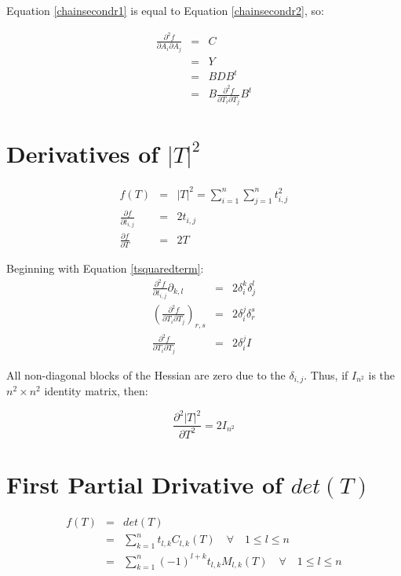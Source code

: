 \documentclass{report}
\begin{document}
Equation \ref{chainsecondr1} is equal to Equation \ref{chainsecondr2}, so:

\begin{eqnarray}
\frac{\partial^2 f}{\partial A_i \partial A_j} &=& C \\
&=& Y \\
&=& B D B^t \\
&=& B \frac{\partial^2 f}{\partial T_i \partial T_j} B^t 
\end{eqnarray}



\section{Derivatives of $|T|^2$}

\begin{eqnarray}
f(T) &=& |T|^2 = \sum_{i=1}^n \sum_{j=1}^n t_{i,j}^2 \\
\label{tsquaredterm}
\frac{\partial f}{\partial t_{i,j}} &=& 2 t_{i,j} \\
\frac{\partial f}{\partial T} &=& 2 T
\end{eqnarray}

Beginning with Equation \ref{tsquaredterm}:
\begin{eqnarray}
\frac{\partial^2 f}{\partial t_{i,j}}{\partial_{k,l}} &=& 2 \delta_i^k \delta_j^l \\
\left(\frac{\partial^2 f}{\partial T_i \partial T_j}\right)_{r,s} &=& 2 \delta_i^j \delta_r^s \\
\frac{\partial^2 f}{\partial T_i \partial T_j} &=& 2 \delta_i^j I
\end{eqnarray}

All non-diagonal blocks of the Hessian are zero due to the $\delta_{i,j}$.  Thus, if $I_{n^2}$ is the $n^2 \times n^2$ identity matrix, then:

\begin{equation}
\frac{\partial^2 |T|^2}{\partial T^2} = 2 I_{n^2}
\end{equation}

\section{First Partial Drivative of $det(T)$}

\begin{eqnarray}
f(T) &=& det(T) \\
     &=& \sum_{k=1}^n t_{l,k} C_{l,k}(T) \quad \forall \quad 1 \le l \le n \\
\label{det1}
     &=& \sum_{k=1}^n (-1)^{l+k} t_{l,k} M_{l,k}(T) \quad \forall \quad 1 \le l \le n
\end{eqnarray}
\end{document}
